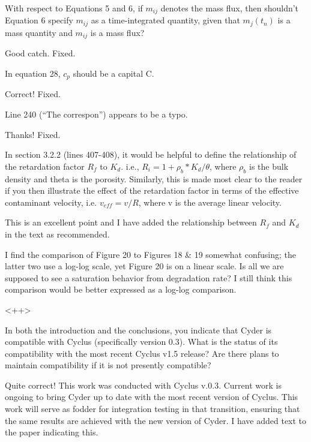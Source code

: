 \documentclass[answers,12pt]{exam}
\begin{document}
\begin{questions}
\question With respect to Equations 5 and 6, if $m_{ij}$ denotes the mass flux, 
then shouldn't Equation 6 specify $m_{ij}$ as a time-integrated quantity, given 
that $m_j(t_n)$ is a mass quantity and $m_{ij}$ is a mass flux?
\begin{solution}
        Good catch. Fixed.
\end{solution}

\question In equation 28, $c_p$ should be a capital C.
\begin{solution}
Correct! Fixed.
\end{solution}

\question Line 240 (``The correspon'') appears to be a typo.
\begin{solution}
Thanks! Fixed.
\end{solution}

\question In section 3.2.2 (lines 407-408), it would be helpful to define the relationship of the retardation factor $R_f$ to $K_d$. i.e., $R_i = 1 + \rho_b 
* K_d / \theta$, where $\rho_b$ is the bulk density and theta is the porosity.  Similarly, this is made most clear to the reader if you then illustrate the effect of the retardation factor in terms of the effective contaminant velocity, i.e. $v_{eff} = v/R$, where v is the average linear velocity.
\begin{solution}
        This is an excellent point and I have added the relationship between 
        $R_f$ and $K_d$ in the text as recommended.
\end{solution}

\question I find the comparison of Figure 20 to Figures 18 \& 19 somewhat confusing; the latter two use a log-log scale, yet Figure 20 is on a linear scale. Is all we are supposed to see a saturation behavior from degradation rate? I still think this comparison would be better expressed as a log-log comparison.
\begin{solution}
<++>
\end{solution}

\question In both the introduction and the conclusions, you indicate that Cyder is compatible with Cyclus (specifically version 0.3). What is the status of its compatibility with the most recent Cyclus v1.5 release? Are there plans to maintain compatibility if it is not presently compatible?
\begin{solution}
Quite correct! This work was conducted with Cyclus v.0.3. Current work is ongoing to 
bring Cyder up to date with the most recent version of Cyclus. This work will 
serve as fodder for integration testing in that transition, ensuring that the 
same results are achieved with the new version of Cyder. I have added text to 
the paper indicating this.
\end{solution}


\end{questions}
\end{document}
